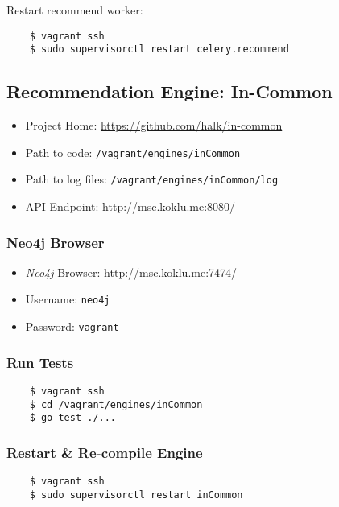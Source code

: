 Restart recommend worker:

\begin{verbatim}
    $ vagrant ssh
    $ sudo supervisorctl restart celery.recommend
\end{verbatim}


\subsection{Recommendation Engine: In-Common}

\begin{itemize}
\item Project Home: \url{https://github.com/halk/in-common}
\item Path to code: \texttt{/vagrant/engines/inCommon}
\item Path to log files: \texttt{/vagrant/engines/inCommon/log}
\item API Endpoint: \url{http://msc.koklu.me:8080/}
\end{itemize}

\subsubsection{Neo4j Browser}

\begin{itemize}
\item \emph{Neo4j} Browser: \url{http://msc.koklu.me:7474/}
\item Username: \texttt{neo4j}
\item Password: \texttt{vagrant}
\end{itemize}

\subsubsection{Run Tests}

\begin{verbatim}
    $ vagrant ssh
    $ cd /vagrant/engines/inCommon
    $ go test ./...
\end{verbatim}

\subsubsection{Restart \& Re-compile Engine}

\begin{verbatim}
    $ vagrant ssh
    $ sudo supervisorctl restart inCommon
\end{verbatim}


